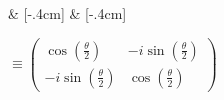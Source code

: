 \begin{quantikz}[row sep={0.6cm,between origins}, wire types={q}]
	 & [-.4cm]  & [-.4cm] \\
\end{quantikz} $ \equiv \begin{pmatrix}
		\cos\!\left(\tfrac{\theta}{2}\right)    & -i \sin\!\left(\tfrac{\theta}{2}\right) \\[.3cm]
		-i \sin\!\left(\tfrac{\theta}{2}\right) & \cos\!\left(\tfrac{\theta}{2}\right)
	\end{pmatrix} $